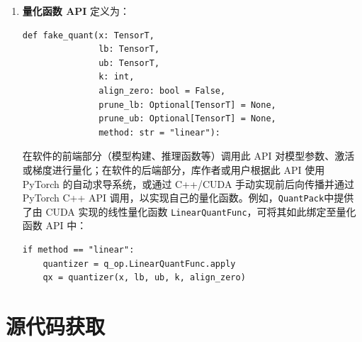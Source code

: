 \documentclass[
  fontset = mac,
]{shtthesis}
\providecommand{\QP}{\texttt{QuantPack}}
\begin{document}
\begin{enumerate}
  \item \textbf{量化函数 API} 定义为：
    \begin{verbatim}
def fake_quant(x: TensorT, 
               lb: TensorT, 
               ub: TensorT, 
               k: int,
               align_zero: bool = False,
               prune_lb: Optional[TensorT] = None,
               prune_ub: Optional[TensorT] = None,
               method: str = "linear"):
    \end{verbatim}
    在软件的前端部分（模型构建、推理函数等）调用此 API 对模型参数、激活或梯度进行量化；在软件的后端部分，库作者或用户根据此 API 使用 PyTorch 的自动求导系统，或通过 C++/CUDA 手动实现前后向传播并通过 PyTorch C++ API 调用，以实现自己的量化函数。例如，\QP 中提供了由 CUDA 实现的线性量化函数 \verb|LinearQuantFunc|，可将其如此绑定至量化函数 API 中：
    \begin{verbatim}
if method == "linear":
    quantizer = q_op.LinearQuantFunc.apply
    qx = quantizer(x, lb, ub, k, align_zero)
    \end{verbatim}
\end{enumerate}

\section{源代码获取}
\end{document}
